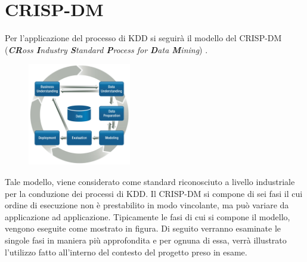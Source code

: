 \section{CRISP-DM}
Per l'applicazione del processo di KDD si seguirà il modello del CRISP-DM (\emph{\textbf{CR}oss \textbf{I}ndustry \textbf{S}tandard \textbf{P}rocess for \textbf{D}ata \textbf{M}ining})
\cite{wirth2000crisp}. 

\begin{figure}
	\centering
	\includegraphics[width=0.4\textwidth]{./images/CRISPDM.png}
	\label{CRISPDM}
\end{figure}

Tale modello, viene considerato come standard riconosciuto a livello industriale per la conduzione dei processi di KDD.
Il CRISP-DM si compone di sei fasi il cui ordine di esecuzione non è prestabilito in modo vincolante, ma può variare da applicazione ad applicazione. Tipicamente le fasi di cui si compone il modello, vengono eseguite come mostrato in figura.
Di seguito verranno esaminate le singole fasi in maniera più approfondita e per ognuna di essa, verrà illustrato l'utilizzo fatto all'interno del contesto del progetto preso in esame.